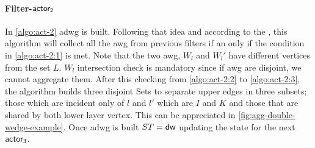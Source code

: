 \paragraph{Filter-$\mathsf{actor_2}$} In \autoref{algo:act-2} \acrshort{adwg} is built. Following that idea and according to the , this algorithm will collect all the \acrshort{awg} 
from previous filters if an only if the condition in \autoref{algo:act-2:1} is met. Note that the two \acrshort{awg}, $W_l$ and $W_l'$ have different vertices from the set $L$. $W_l$ intersection check is mandatory since if \acrshort{awg} are disjoint, we cannot aggregate them.
After this checking from \autoref{algo:act-2:2} to \autoref{algo:act-2:3}, the algorithm builds three disjoint Sets to separate upper edges in three subsets; those which are incident only of 
$l$ and $l'$ which are $I$ and $K$ and those that are shared by both lower layer vertex. This can be appreciated in \autoref{fig:agg-double-wedge-example}.
Once \acrshort{adwg} is built $ST = \mathsf{dw}$ updating the state for the next $\mathsf{actor_3}$.


